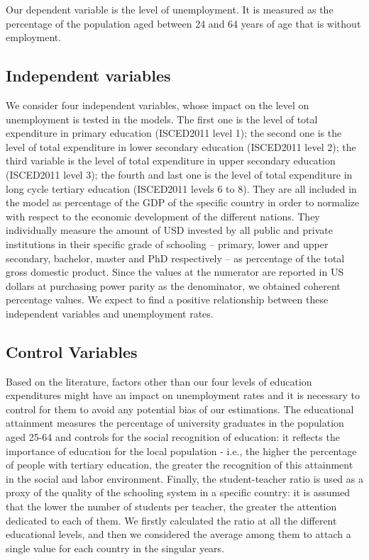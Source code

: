 \documentclass[
]{article}
\begin{document}
Our dependent variable is the level of unemployment. It is measured as
the percentage of the population aged between 24 and 64 years of age
that is without employment.

\hypertarget{independent-variables}{%
\subsection{Independent variables}\label{independent-variables}}

We consider four independent variables, whose impact on the level on
unemployment is tested in the models. The first one is the level of
total expenditure in primary education (ISCED2011 level 1); the second
one is the level of total expenditure in lower secondary education
(ISCED2011 level 2); the third variable is the level of total
expenditure in upper secondary education (ISCED2011 level 3); the fourth
and last one is the level of total expenditure in long cycle tertiary
education (ISCED2011 levels 6 to 8). They are all included in the model
as percentage of the GDP of the specific country in order to normalize
with respect to the economic development of the different nations. They
individually measure the amount of USD invested by all public and
private institutions in their specific grade of schooling -- primary,
lower and upper secondary, bachelor, master and PhD respectively -- as
percentage of the total gross domestic product. Since the values at the
numerator are reported in US dollars at purchasing power parity as the
denominator, we obtained coherent percentage values. We expect to find a
positive relationship between these independent variables and
unemployment rates.

\hypertarget{control-variables}{%
\subsection{Control Variables}\label{control-variables}}

Based on the literature, factors other than our four levels of education
expenditures might have an impact on unemployment rates and it is
necessary to control for them to avoid any potential bias of our
estimations. The educational attainment measures the percentage of
university graduates in the population aged 25-64 and controls for the
social recognition of education: it reflects the importance of education
for the local population - i.e., the higher the percentage of people
with tertiary education, the greater the recognition of this attainment
in the social and labor environment. Finally, the student-teacher ratio
is used as a proxy of the quality of the schooling system in a specific
country: it is assumed that the lower the number of students per
teacher, the greater the attention dedicated to each of them. We firstly
calculated the ratio at all the different educational levels, and then
we considered the average among them to attach a single value for each
country in the singular years.
\end{document}
